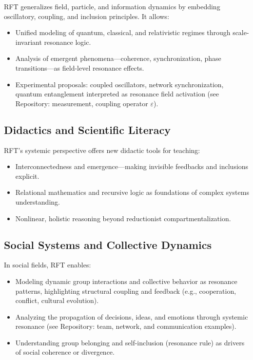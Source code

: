 \documentclass[12pt]{article}
\begin{document}
RFT generalizes field, particle, and information dynamics by embedding oscillatory, coupling, and inclusion principles. It allows:
\begin{itemize}
	\item Unified modeling of quantum, classical, and relativistic regimes through scale-invariant resonance logic.
	\item Analysis of emergent phenomena—coherence, synchronization, phase transitions—as field-level resonance effects.
	\item Experimental proposals: coupled oscillators, network synchronization, quantum entanglement interpreted as resonance field activation (see Repository: measurement, coupling operator $\varepsilon$).
\end{itemize}

\subsection{Didactics and Scientific Literacy}

RFT’s systemic perspective offers new didactic tools for teaching:
\begin{itemize}
	\item Interconnectedness and emergence—making invisible feedbacks and inclusions explicit.
	\item Relational mathematics and recursive logic as foundations of complex systems understanding.
	\item Nonlinear, holistic reasoning beyond reductionist compartmentalization.
\end{itemize}

\subsection{Social Systems and Collective Dynamics}

In social fields, RFT enables:
\begin{itemize}
	\item Modeling dynamic group interactions and collective behavior as resonance patterns, highlighting structural coupling and feedback (e.g., cooperation, conflict, cultural evolution).
	\item Analyzing the propagation of decisions, ideas, and emotions through systemic resonance (see Repository: team, network, and communication examples).
	\item Understanding group belonging and self-inclusion (resonance rule) as drivers of social coherence or divergence.
\end{itemize}
\end{document}
